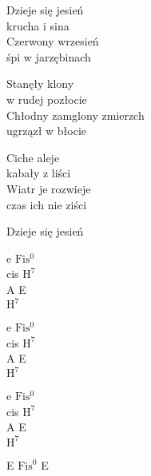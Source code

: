 \begin{text}
    Dzieje się jesień\\
    krucha i sina\\
    Czerwony wrzesień\\
    śpi w jarzębinach

    Stanęły klony\\
    w rudej pozłocie\\
    Chłodny zamglony zmierzch\\
    ugrzązł w błocie

    Ciche aleje\\
    kabały z liści\\
    Wiatr je rozwieje\\
    czas ich nie ziści

    Dzieje się jesień
\end{text}
\begin{chord}
    e $\mathrm{Fis^{0}}$\\
    cis $\mathrm{H^{7}}$\\
    A E\\
    $\mathrm{H^{7}}$

    e $\mathrm{Fis^{0}}$\\
    cis $\mathrm{H^{7}}$\\
    A E\\
    $\mathrm{H^{7}}$

    e $\mathrm{Fis^{0}}$\\
    cis $\mathrm{H^{7}}$\\
    A E\\
    $\mathrm{H^{7}}$

    E $\mathrm{Fis^{0}}$ E

\end{chord}
